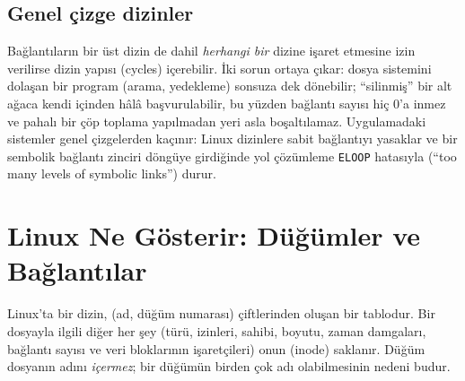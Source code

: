 \subsection{Genel çizge dizinler}

Bağlantıların bir üst dizin de dahil \emph{herhangi bir} dizine işaret etmesine izin verilirse dizin yapısı  (cycles) içerebilir. İki sorun ortaya çıkar: dosya sistemini dolaşan bir program (arama, yedekleme) sonsuza dek dönebilir; ``silinmiş'' bir alt ağaca kendi içinden hâlâ başvurulabilir, bu yüzden bağlantı sayısı hiç $0$'a inmez ve pahalı bir çöp toplama yapılmadan yeri asla boşaltılamaz. Uygulamadaki sistemler genel çizgelerden kaçınır: Linux dizinlere sabit bağlantıyı yasaklar ve bir sembolik bağlantı zinciri döngüye girdiğinde yol çözümleme \texttt{ELOOP} hatasıyla (``too many levels of symbolic links'') durur.

\section{Linux Ne Gösterir: Düğümler ve Bağlantılar}
\label{sec:inode}

Linux'ta bir dizin, (ad, düğüm numarası) çiftlerinden oluşan bir tablodur. Bir dosyayla ilgili diğer her şey (türü, izinleri, sahibi, boyutu, zaman damgaları, bağlantı sayısı ve veri bloklarının işaretçileri) onun  (inode) saklanır. Düğüm dosyanın adını \emph{içermez}; bir düğümün birden çok adı olabilmesinin nedeni budur.

